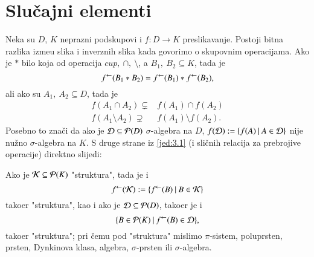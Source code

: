 
\chapter{Slu\v cajni elementi}

Neka su $D$, $K$ neprazni podskupovi i $f: D \to K$ preslikavanje.
Postoji bitna razlika izme\dj u slika i inverznih slika kada govorimo
o skupovnim operacijama. Ako je $*$ bilo koja od operacija $cup, \:
\cap, \: \setminus$, a $B_1, \: B_2 \subseteq K$, tada je
\begin{equation} \label{jed:3.1}
    {f}^{\leftarrow} (B_1 * B_2) = {f}^{\leftarrow}(B_1) * {f}^{\leftarrow}(B_2),
\end{equation}
ali ako su $A_1, \: A_2 \subseteq D$, tada je
\begin{align*}
    f(A_1 \cap A_2) \subsetneq& f(A_1) \cap f(A_2) \\
    f(A_1 \setminus A_2) \supsetneq& f(A_1) \setminus f(A_2). 
\end{align*}
Posebno to zna\v ci da ako je $\mathcal{D} \subseteq \mathcal{P}({D})$
$\sigma$-algebra na $D$, $f(\mathcal{D}) := \{{f(A)} \: | \: {A \in
\mathcal{D}}\}$ nije nu\v zno $\sigma$-algebra na $K$.
S druge strane iz \eqref{jed:3.1} (i sli\v cnih relacija za
prebrojive operacije) direktno slijedi:

Ako je $\mathcal{K} \subseteq \mathcal{P}({K})$ "struktura", tada je i
\begin{equation} \label{jed:3.2}
    {f}^{\leftarrow}(\mathcal{K}) := \{{{f}^{\leftarrow}(B)} \: | \: {B \in
        \mathcal{K}}\}
\end{equation}
tako\dj er "struktura", kao i ako je $\mathcal{D} \subseteq
\mathcal{P}({D})$, tako\dj er je i
\begin{equation} \label{jed:3.3}
    \{{B \in \mathcal{P}({K})} \: | \: {{f}^{\leftarrow}(B) \in \mathcal{D}}\},
\end{equation}
tako\dj er "struktura";
pri \v cemu pod "struktura" mislimo $\pi$-sistem, poluprsten, prsten,
Dynkinova klasa, algebra, $\sigma$-prsten ili $\sigma$-algebra.


